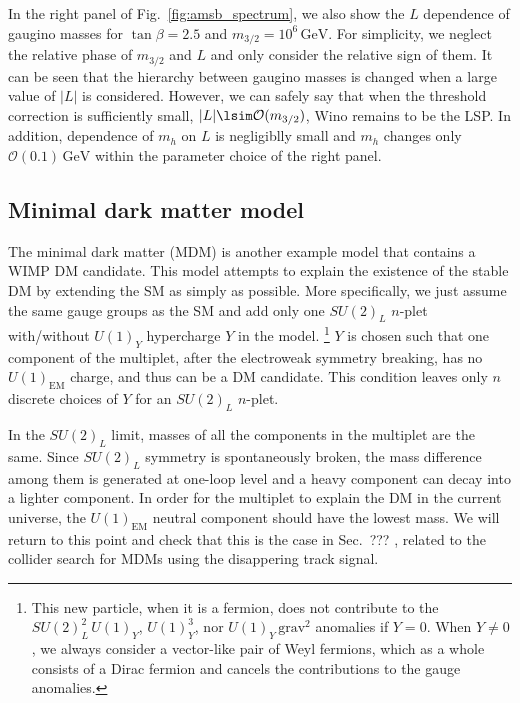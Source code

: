 \documentclass[12pt,twoside,book]{article}
\begin{document}
In the right panel of Fig.~\ref{fig:amsb_spectrum}, we also show the $L$ dependence of gaugino masses for $\tan\beta = 2.5$ and $m_{3/2} = 10^6\,\mathrm{GeV}$.
For simplicity, we neglect the relative phase of $m_{3/2}$ and $L$ and only consider the relative sign of them.
It can be seen that the hierarchy between gaugino masses is changed when a large value of $|L|$ is considered.
However, we can safely say that when the threshold correction is sufficiently small, $|L| \lsim \mathcal{O}(m_{3/2})$, Wino remains to be the LSP.
In addition, dependence of $m_h$ on $L$ is negligiblly small and $m_h$ changes only $\mathcal{O} (0.1)\,\mathrm{GeV}$ within the parameter choice of the right panel.



\subsection{Minimal dark matter model}

The minimal dark matter (MDM) \cite{Cirelli:2005uq, Cirelli:2007xd, Cirelli:2009uv} is another example model that contains a WIMP DM candidate.
This model attempts to explain the existence of the stable DM by extending the SM as simply as possible.
More specifically, we just assume the same gauge groups as the SM and add only one $SU(2)_L$ $n$-plet with/without $U(1)_Y$ hypercharge $Y$ in the model.
\footnote{
  This new particle, when it is a fermion, does not contribute to the $SU(2)_L^2\, U(1)_Y$, $U(1)_Y^3$, nor $U(1)_Y\,\text{grav}^2$ anomalies if $Y=0$.
  When $Y \neq 0$, we always consider a vector-like pair of Weyl fermions, which as a whole consists of a Dirac fermion and cancels the contributions to the gauge anomalies.
}
$Y$ is chosen such that one component of the multiplet, after the electroweak symmetry breaking, has no $U(1)_{\mathrm{EM}}$ charge, and thus can be a DM candidate.
This condition leaves only $n$ discrete choices of $Y$ for an $SU(2)_L$ $n$-plet.

In the $SU(2)_L$ limit, masses of all the components in the multiplet are the same.
Since $SU(2)_L$ symmetry is spontaneously broken, the mass difference among them is generated at one-loop level and a heavy component can decay into a lighter component.
In order for the multiplet to explain the DM in the current universe, the $U(1)_{\mathrm{EM}}$ neutral component should have the lowest mass.
We will return to this point and check that this is the case in Sec.~??? , related to the collider search for MDMs using the disappering track signal.
\end{document}
